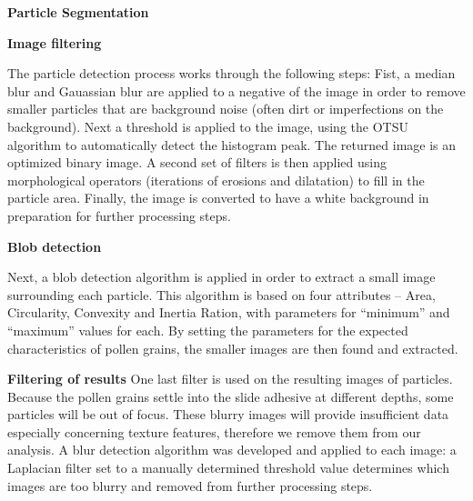 \textbf{Particle Segmentation} 


\textbf{Image filtering}

The particle detection process works through the following steps: Fist, a median blur and Gauassian blur are applied to a negative of the image in order to remove smaller particles that are background noise (often dirt or imperfections on the background). 
Next a threshold is applied to the image, using the OTSU algorithm to automatically detect the histogram peak. The returned image is an optimized binary image. A second set of filters is then applied using morphological operators (iterations of erosions and dilatation) to fill in the particle area. Finally, the image is converted to have a white background in preparation for further processing steps.


\textbf{Blob detection}

Next, a blob detection algorithm is applied in order to extract a small image surrounding each particle. This algorithm is based on four attributes – Area, Circularity, Convexity and Inertia Ration, with parameters for “minimum” and “maximum” values for each. By setting the parameters for the expected characteristics of pollen grains, the smaller images are then found and extracted.

\textbf{Filtering of results}
One last filter is used on the resulting images of particles. Because the pollen grains settle into the slide adhesive at different depths, some particles will be out of focus. These blurry images will provide insufficient data especially concerning texture features, therefore we remove them from our analysis. A blur detection algorithm was developed and applied to each image: a Laplacian filter set to a manually determined threshold value determines which images are too blurry and removed from further processing steps. 

    
    
    
    
  
  